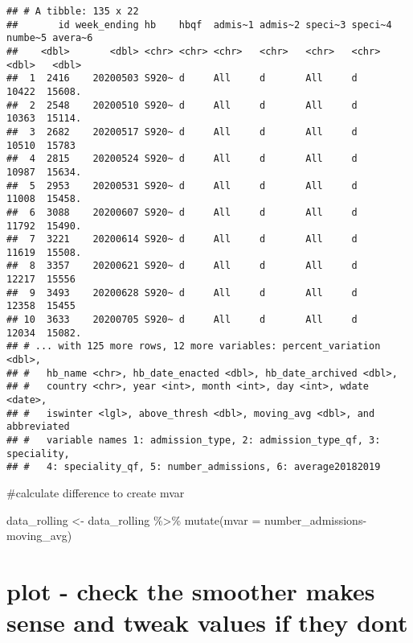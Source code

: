 \documentclass[
]{article}
\newenvironment{Shaded}{\begin{snugshade}}{\end{snugshade}}
\newcommand{\AttributeTok}[1]{\textcolor[rgb]{0.77,0.63,0.00}{#1}}
\newcommand{\FunctionTok}[1]{\textcolor[rgb]{0.00,0.00,0.00}{#1}}
\newcommand{\NormalTok}[1]{#1}
\newcommand{\OtherTok}[1]{\textcolor[rgb]{0.56,0.35,0.01}{#1}}
\newcommand{\SpecialCharTok}[1]{\textcolor[rgb]{0.00,0.00,0.00}{#1}}
\begin{document}
\begin{verbatim}
## # A tibble: 135 x 22
##       id week_ending hb    hbqf  admis~1 admis~2 speci~3 speci~4 numbe~5 avera~6
##    <dbl>       <dbl> <chr> <chr> <chr>   <chr>   <chr>   <chr>     <dbl>   <dbl>
##  1  2416    20200503 S920~ d     All     d       All     d         10422  15608.
##  2  2548    20200510 S920~ d     All     d       All     d         10363  15114.
##  3  2682    20200517 S920~ d     All     d       All     d         10510  15783 
##  4  2815    20200524 S920~ d     All     d       All     d         10987  15634.
##  5  2953    20200531 S920~ d     All     d       All     d         11008  15458.
##  6  3088    20200607 S920~ d     All     d       All     d         11792  15490.
##  7  3221    20200614 S920~ d     All     d       All     d         11619  15508.
##  8  3357    20200621 S920~ d     All     d       All     d         12217  15556 
##  9  3493    20200628 S920~ d     All     d       All     d         12358  15455 
## 10  3633    20200705 S920~ d     All     d       All     d         12034  15082.
## # ... with 125 more rows, 12 more variables: percent_variation <dbl>,
## #   hb_name <chr>, hb_date_enacted <dbl>, hb_date_archived <dbl>,
## #   country <chr>, year <int>, month <int>, day <int>, wdate <date>,
## #   iswinter <lgl>, above_thresh <dbl>, moving_avg <dbl>, and abbreviated
## #   variable names 1: admission_type, 2: admission_type_qf, 3: speciality,
## #   4: speciality_qf, 5: number_admissions, 6: average20182019
\end{verbatim}

\#calculate difference to create mvar

\begin{Shaded}
\begin{Highlighting}[]
\NormalTok{data\_rolling }\OtherTok{\textless{}{-}}\NormalTok{ data\_rolling }\SpecialCharTok{\%\textgreater{}\%} 
  \FunctionTok{mutate}\NormalTok{(}\AttributeTok{mvar =}\NormalTok{ number\_admissions}\SpecialCharTok{{-}}\NormalTok{ moving\_avg)}
\end{Highlighting}
\end{Shaded}

\hypertarget{plot---check-the-smoother-makes-sense-and-tweak-values-if-they-dont}{%
\section{plot - check the smoother makes sense and tweak values if they
dont}\label{plot---check-the-smoother-makes-sense-and-tweak-values-if-they-dont}}
\end{document}
